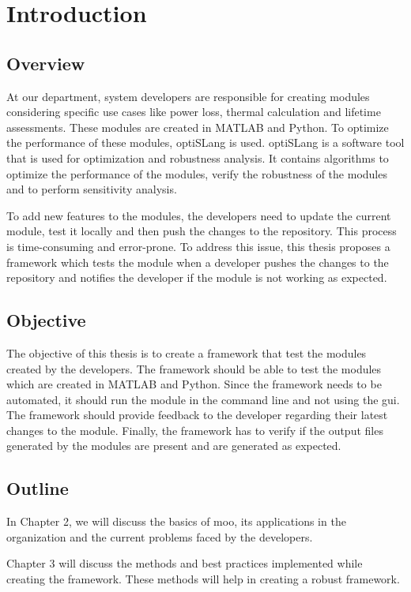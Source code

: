 \chapter{Introduction}
\section{Overview}
At our department, system developers are responsible for creating modules considering specific use cases like power loss, thermal calculation and
lifetime assessments. These modules are created in MATLAB and Python. To optimize the performance of these modules, optiSLang is used. optiSLang is a software 
tool that is used for optimization and robustness analysis. It contains algorithms to optimize the performance of the modules, verify the robustness of the 
modules and to perform sensitivity analysis. 

To add new features to the modules, the developers need to update the current module, test it locally and then push the changes to the repository.
This process is time-consuming and error-prone. To address this issue, this thesis proposes a framework which tests the module when a developer pushes the 
changes to the repository and notifies the developer if the module is not working as expected. 

\section{Objective}
The objective of this thesis is to create a framework that test the modules created by the developers. The framework should be able to test the modules which 
are created in MATLAB and Python. Since the framework needs to be automated, it should run the module in the command line and not using the \acrshort{gui}.
The framework should provide feedback to the developer regarding their latest changes to the module. Finally, the framework has to verify if the output 
files generated by the modules are present and are generated as expected.

\section{Outline}
In Chapter 2, we will discuss the basics of \acrlong{moo}, its applications in the organization and the current problems faced by the developers.

Chapter 3 will discuss the methods and best practices implemented while creating the framework. These methods will help in creating a robust framework.

